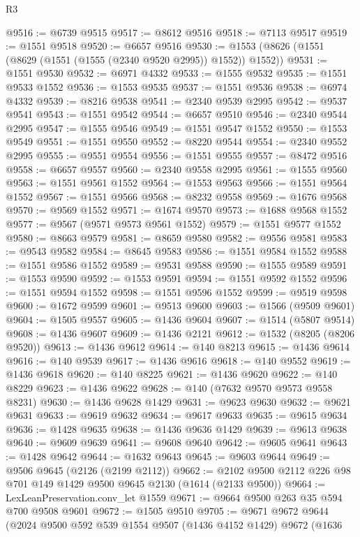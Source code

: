 \begin{lexlean}{R3}
\begin{coremodule}
@9516 := @6739 @9515
@9517 := @8612 @9516
@9518 := @7113 @9517
@9519 := @1551 @9518
@9520 := @6657 @9516
@9530 := @1553 (@8626 (@1551 (@8629 (@1551 (@1555 (@2340 @9520 @2995)) @1552)) @1552))
@9531 := @1551 @9530
@9532 := @6971 @4332
@9533 := @1555 @9532
@9535 := @1551 @9533 @1552
@9536 := @1553 @9535
@9537 := @1551 @9536
@9538 := @6974 @4332
@9539 := @8216 @9538
@9541 := @2340 @9539 @2995
@9542 := @9537 @9541
@9543 := @1551 @9542
@9544 := @6657 @9510
@9546 := @2340 @9544 @2995
@9547 := @1555 @9546
@9549 := @1551 @9547 @1552
@9550 := @1553 @9549
@9551 := @1551 @9550
@9552 := @8220 @9544
@9554 := @2340 @9552 @2995
@9555 := @9551 @9554
@9556 := @1551 @9555
@9557 := @8472 @9516
@9558 := @6657 @9557
@9560 := @2340 @9558 @2995
@9561 := @1555 @9560
@9563 := @1551 @9561 @1552
@9564 := @1553 @9563
@9566 := @1551 @9564 @1552
@9567 := @1551 @9566
@9568 := @8232 @9558
@9569 := @1676 @9568
@9570 := @9569 @1552
@9571 := @1674 @9570
@9573 := @1688 @9568 @1552
@9577 := @9567 (@9571 @9573 @9561 @1552)
@9579 := @1551 @9577 @1552
@9580 := @8663 @9579
@9581 := @8659 @9580
@9582 := @9556 @9581
@9583 := @9543 @9582
@9584 := @8645 @9583
@9586 := @1551 @9584 @1552
@9588 := @1551 @9586 @1552
@9589 := @9531 @9588
@9590 := @1555 @9589
@9591 := @1553 @9590
@9592 := @1553 @9591
@9594 := @1551 @9592 @1552
@9596 := @1551 @9594 @1552
@9598 := @1551 @9596 @1552
@9599 := @9519 @9598
@9600 := @1672 @9599
@9601 := @9513 @9600
@9603 := @1566 (@9509 @9601)
@9604 := @1505 @9557
@9605 := @1436 @9604
@9607 := @1514 (@5807 @9514)
@9608 := @1436 @9607
@9609 := @1436 @2121
@9612 := @1532 (@8205 (@8206 @9520))
@9613 := @1436 @9612
@9614 := @140 @8213
@9615 := @1436 @9614
@9616 := @140 @9539
@9617 := @1436 @9616
@9618 := @140 @9552
@9619 := @1436 @9618
@9620 := @140 @8225
@9621 := @1436 @9620
@9622 := @140 @8229
@9623 := @1436 @9622
@9628 := @140 (@7632 @9570 @9573 @9558 @8231)
@9630 := @1436 @9628 @1429
@9631 := @9623 @9630
@9632 := @9621 @9631
@9633 := @9619 @9632
@9634 := @9617 @9633
@9635 := @9615 @9634
@9636 := @1428 @9635
@9638 := @1436 @9636 @1429
@9639 := @9613 @9638
@9640 := @9609 @9639
@9641 := @9608 @9640
@9642 := @9605 @9641
@9643 := @1428 @9642
@9644 := @1632 @9643
@9645 := @9603 @9644
@9649 := @9506 @9645 (@2126 (@2199 @2112))
@9662 := @2102 @9500 @2112 @226 @98 @701 @149 @1429 @9500 @9645 @2130 (@1614 (@2133 @9500))
@9664 := LexLeanPreservation.conv_let @1559
@9671 := @9664 @9500 @263 @35 @594 @700 @9508 @9601
@9672 := @1505 @9510
@9705 := @9671
    @9672
    @9644
    (@2024
      @9500
      @592
      @539
      @1554
      @9507
      (@1436 @4152 @1429)
      @9672
      (@1636

\end{coremodule}
\end{lexlean}
